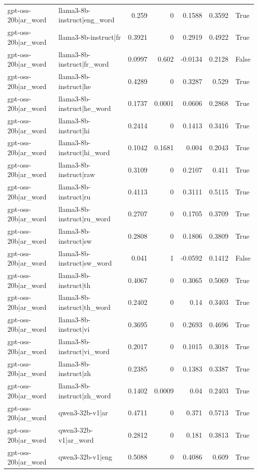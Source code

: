 \begin{table}
\begin{tabular}{l l r r r r l}
gpt-oss-20b|ar_word & llama3-8b-instruct|eng_word & 0.259 & 0 & 0.1588 & 0.3592 & True \\
gpt-oss-20b|ar_word & llama3-8b-instruct|fr & 0.3921 & 0 & 0.2919 & 0.4922 & True \\
gpt-oss-20b|ar_word & llama3-8b-instruct|fr_word & 0.0997 & 0.602 & -0.0134 & 0.2128 & False \\
gpt-oss-20b|ar_word & llama3-8b-instruct|he & 0.4289 & 0 & 0.3287 & 0.529 & True \\
gpt-oss-20b|ar_word & llama3-8b-instruct|he_word & 0.1737 & 0.0001 & 0.0606 & 0.2868 & True \\
gpt-oss-20b|ar_word & llama3-8b-instruct|hi & 0.2414 & 0 & 0.1413 & 0.3416 & True \\
gpt-oss-20b|ar_word & llama3-8b-instruct|hi_word & 0.1042 & 0.1681 & 0.004 & 0.2043 & True \\
gpt-oss-20b|ar_word & llama3-8b-instruct|raw & 0.3109 & 0 & 0.2107 & 0.411 & True \\
gpt-oss-20b|ar_word & llama3-8b-instruct|ru & 0.4113 & 0 & 0.3111 & 0.5115 & True \\
gpt-oss-20b|ar_word & llama3-8b-instruct|ru_word & 0.2707 & 0 & 0.1705 & 0.3709 & True \\
gpt-oss-20b|ar_word & llama3-8b-instruct|sw & 0.2808 & 0 & 0.1806 & 0.3809 & True \\
gpt-oss-20b|ar_word & llama3-8b-instruct|sw_word & 0.041 & 1 & -0.0592 & 0.1412 & False \\
gpt-oss-20b|ar_word & llama3-8b-instruct|th & 0.4067 & 0 & 0.3065 & 0.5069 & True \\
gpt-oss-20b|ar_word & llama3-8b-instruct|th_word & 0.2402 & 0 & 0.14 & 0.3403 & True \\
gpt-oss-20b|ar_word & llama3-8b-instruct|vi & 0.3695 & 0 & 0.2693 & 0.4696 & True \\
gpt-oss-20b|ar_word & llama3-8b-instruct|vi_word & 0.2017 & 0 & 0.1015 & 0.3018 & True \\
gpt-oss-20b|ar_word & llama3-8b-instruct|zh & 0.2385 & 0 & 0.1383 & 0.3387 & True \\
gpt-oss-20b|ar_word & llama3-8b-instruct|zh_word & 0.1402 & 0.0009 & 0.04 & 0.2403 & True \\
gpt-oss-20b|ar_word & qwen3-32b-v1|ar & 0.4711 & 0 & 0.371 & 0.5713 & True \\
gpt-oss-20b|ar_word & qwen3-32b-v1|ar_word & 0.2812 & 0 & 0.181 & 0.3813 & True \\
gpt-oss-20b|ar_word & qwen3-32b-v1|eng & 0.5088 & 0 & 0.4086 & 0.609 & True \\

\end{tabular}
\end{table}
